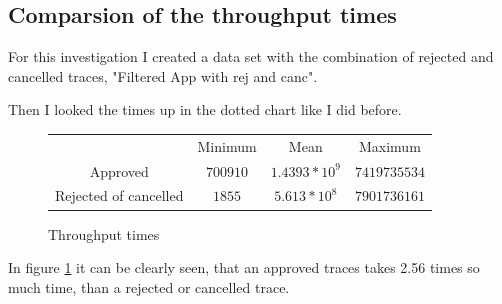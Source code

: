 \subsection{Comparsion of the throughput times}

For this investigation I created a data set with the combination of rejected and cancelled traces, "Filtered App with rej and canc".

Then I looked the times up in the dotted chart like I did before.


\begin{figure}[!htbp]
\centering
\begin{tabular}{|c|c|c|c|}
\hline
& Minimum & Mean & Maximum \\ \cline{1-4}
Approved& $700910$ & $1.4393*10^9$ & $ 7419735534$      \\ \cline{1-4}
Rejected of cancelled  & $1855$ & $5.613*10^8$ & $7901736161$       \\ \cline{1-4}
\end{tabular}
\caption{Throughput times}
\label{tab:Throughtimes}
\end{figure}

In figure \ref{tab:Throughtimes} it can be clearly seen, that an approved traces takes 2.56 times so much time, than a rejected or cancelled trace. 
